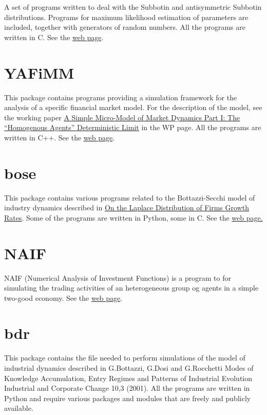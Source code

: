 \documentclass[11pt]{article}
\begin{document}
A set of programs written to deal with the Subbotin and antisymmetric
Subbotin distributions. Programs for maximum likelihood estimation of
parameters are included, together with generators of random
numbers. All the programs are written in C.  See the \href{http://www.cafed.sssup.it/software/subbotools/index.html}{web page}.
\section{YAFiMM}
\label{sec-4}


This package contains programs providing a simulation framework for
the analysis of a specific financial market model. For the description
of the model, see the working paper \href{http://www.sssup.it/%7ELEM/WPLem/2002-10.html}{A Simple Micro-Model of Market Dynamics Part I: The ``Homogenous Agents'' Deterministic Limit} in the WP
page. All the programs are written in C++. See the \href{http://www.cafed.sssup.it/software/yafimm/index.html"}{web page}.
\section{bose}
\label{sec-5}


This package contains various programs related to the Bottazzi-Secchi
model of industry dynamics described in \href{http://www.sssup.it/%7ELEM/WPLem/2002-20.html}{On the Laplace Distribution of Firms Growth Rates}. Some of the programs are written in Python, some
in C. See the \href{http://www.cafed.sssup.it/software/bose/index.html"}{web page.}
\section{NAIF}
\label{sec-6}


NAIF (Numerical Analysis of Investment Functions) is a program to for
simulating the trading activities of an heterogeneous group og agents
in a simple two-good economy. See the \href{http://www.cafed.sssup.it/software/naif/naif.html"}{web page}.
\section{bdr}
\label{sec-7}


This package contains the file needed to perform simulations of the
model of industrial dynamics described in G.Bottazzi, G.Dosi and
G.Rocchetti Modes of Knowledge Accumulation, Entry Regimes and
Patterns of Industrial Evolution Industrial and Corporate Change 10,3
(2001). All the programs are written in Python and require various
packages and modules that are freely and publicly available.
\end{document}
